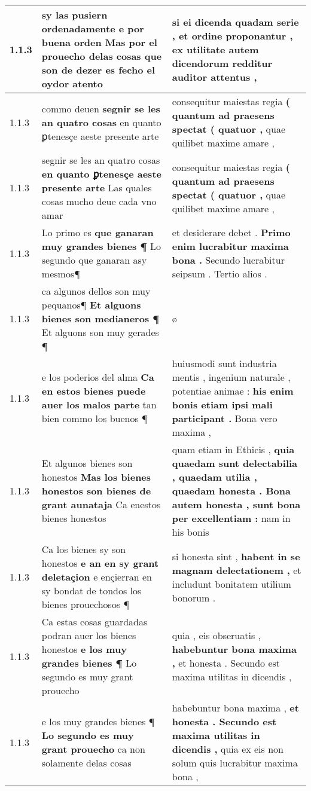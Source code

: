 \begin{tabular}{|p{1cm}|p{6.5cm}|p{6.5cm}|}
1.1.3 & sy las pusiern ordenadamente \textbf{ e por buena orden } Mas por el prouecho delas cosas que son de dezer es fecho el oydor atento & si ei dicenda quadam serie , \textbf{ et ordine proponantur , } ex utilitate autem dicendorum redditur auditor attentus , \\\hline
1.1.3 & commo deuen \textbf{ segnir se les an quatro cosas } en quanto ꝑtenesçe aeste presente arte & consequitur maiestas regia \textbf{ ( quantum ad praesens spectat ( quatuor , } quae quilibet maxime amare , \\\hline
1.1.3 & segnir se les an quatro cosas \textbf{ en quanto ꝑtenesçe aeste presente arte } Las quales cosas mucho deue cada vno amar & consequitur maiestas regia \textbf{ ( quantum ad praesens spectat ( quatuor , } quae quilibet maxime amare , \\\hline
1.1.3 & Lo primo es \textbf{ que ganaran muy grandes bienes ¶ } Lo segundo que ganaran asy mesmos¶ & et desiderare debet . \textbf{ Primo enim lucrabitur maxima bona . } Secundo lucrabitur seipsum . Tertio alios . \\\hline
1.1.3 & ca algunos dellos son muy pequanos¶ \textbf{ Et alguons bienes son medianeros ¶ } Et alguons son muy gerades ¶ & ø \\\hline
1.1.3 & e los poderios del alma \textbf{ Ca en estos bienes puede auer los malos parte } tan bien commo los buenos ¶ & huiusmodi sunt industria mentis , ingenium naturale , potentiae animae : \textbf{ his enim bonis etiam ipsi mali participant . } Bona vero maxima , \\\hline
1.1.3 & Et algunos bienes son honestos \textbf{ Mas los bienes honestos son bienes de grant aunataja } Ca enestos bienes honestos & quam etiam in Ethicis , \textbf{ quia quaedam sunt delectabilia , quaedam utilia , quaedam honesta . Bona autem honesta , sunt bona per excellentiam : } nam in his bonis \\\hline
1.1.3 & Ca los bienes sy son honestos \textbf{ e an en sy grant deletaçion } e ençierran en sy bondat de tondos los bienes prouechosos ¶ & si honesta sint , \textbf{ habent in se magnam delectationem , } et includunt bonitatem utilium bonorum . \\\hline
1.1.3 & Ca estas cosas guardadas podran auer los bienes honestos \textbf{ e los muy grandes bienes ¶ } Lo segundo es muy grant prouecho & quia , eis obseruatis , \textbf{ habebuntur bona maxima , } et honesta . Secundo est maxima utilitas in dicendis , \\\hline
1.1.3 & e los muy grandes bienes ¶ \textbf{ Lo segundo es muy grant prouecho } ca non solamente delas cosas & habebuntur bona maxima , \textbf{ et honesta . Secundo est maxima utilitas in dicendis , } quia ex eis non solum quis lucrabitur maxima bona , \\\hline

\end{tabular}
